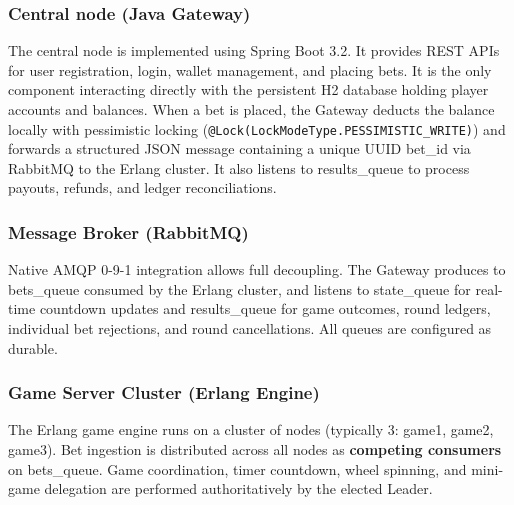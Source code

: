 \documentclass[12pt,a4paper]{article}
\begin{document}
\subsubsection{Central node (Java Gateway)}
The central node is implemented using Spring Boot 3.2. It provides REST APIs for user registration, login, wallet management, and placing bets. It is the only component interacting directly with the persistent H2 database holding player accounts and balances. When a bet is placed, the Gateway deducts the balance locally with pessimistic locking (\texttt{@Lock(LockModeType.\allowbreak PESSIMISTIC\_\allowbreak WRITE)}) and forwards a structured JSON message containing a unique UUID bet\_\allowbreak id via RabbitMQ to the Erlang cluster. It also listens to results\_\allowbreak queue to process payouts, refunds, and ledger reconciliations.

\subsubsection{Message Broker (RabbitMQ)}
Native AMQP 0-9-1 integration allows full decoupling. The Gateway produces to bets\_\allowbreak queue consumed by the Erlang cluster, and listens to state\_\allowbreak queue for real-time countdown updates and results\_\allowbreak queue for game outcomes, round ledgers, individual bet rejections, and round cancellations. All queues are configured as durable.

\subsubsection{Game Server Cluster (Erlang Engine)}
The Erlang game engine runs on a cluster of nodes (typically 3: game1, game2, game3). Bet ingestion is distributed across all nodes as \textbf{competing consumers} on bets\_\allowbreak queue. Game coordination, timer countdown, wheel spinning, and mini-game delegation are performed authoritatively by the elected Leader.
\end{document}
